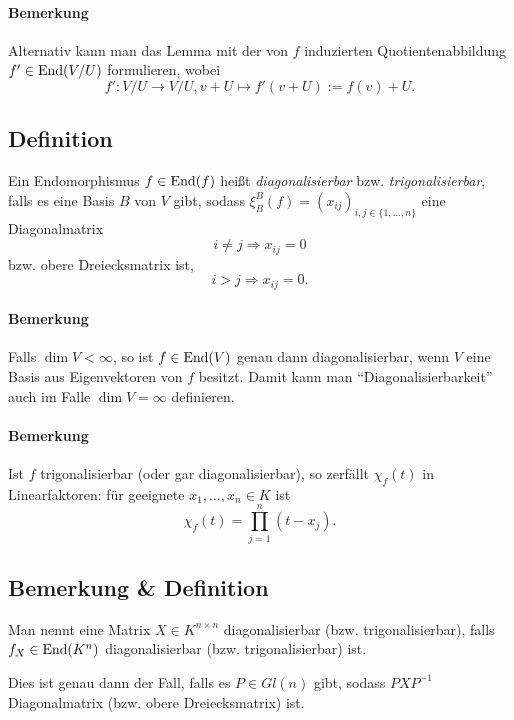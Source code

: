 \paragraph{Bemerkung}
	Alternativ kann man das Lemma mit der von $ f $ induzierten Quotientenabbildung $ f'\in \operatorname{End}(V/U) $ formulieren, wobei
		\[ f':V/U\to V/U, v+U\mapsto f'(v+U) := f(v)+U. \]
\subsection{Definition}
\begin{Definition}
	Ein Endomorphismus $ f\in\operatorname{End}(f) $ heißt \emph{diagonalisierbar} bzw. \emph{trigonalisierbar}, falls es eine Basis $ B $ von $ V $ gibt, sodass $ \xi_B^B(f)=(x_{ij})_{i,j\in\{1,\dots,n\}} $ eine Diagonalmatrix 
		\[ i\neq j\Rightarrow x_{ij} = 0 \]
	bzw. obere Dreiecksmatrix ist,
		\[ i>j \Rightarrow x_{ij} = 0. \]
\end{Definition}
\paragraph{Bemerkung}
	Falls $ \dim V<\infty $, so ist $ f\in\operatorname{End}(V) $ genau dann diagonalisierbar, wenn $ V $ eine Basis aus Eigenvektoren von $ f $ besitzt. Damit kann man "`Diagonalisierbarkeit"' auch im Falle $ \dim V=\infty $ definieren.
\paragraph{Bemerkung}
	Ist $ f $ trigonalisierbar (oder gar diagonalisierbar), so zerfällt $ \chi_f (t) $ in Linearfaktoren: für geeignete $ x_1,\dots,x_n\in K $ ist
		\[ \chi_f(t)=\prod_{j=1}^{n}(t-x_j). \]
\subsection{Bemerkung \& Definition}
\begin{Definition}
	Man nennt eine Matrix $ X\in K^{n\times n} $ diagonalisierbar (bzw. trigonalisierbar), falls $ f_X\in \operatorname{End}(K^n) $ diagonalisierbar (bzw. trigonalisierbar) ist.
\end{Definition}	

	Dies ist genau dann der Fall, falls es $ P\in Gl(n) $ gibt, sodass $ PXP^{-1} $ Diagonalmatrix (bzw. obere Dreiecksmatrix) ist.


